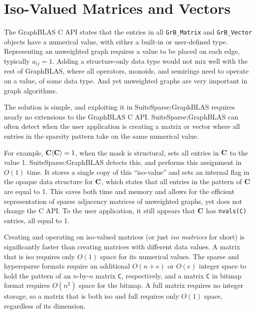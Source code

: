 
\newpage
\section{Iso-Valued Matrices and Vectors } %
\label{iso}

The GraphBLAS C API states that the entries in all \verb'GrB_Matrix' and
\verb'GrB_Vector' objects have a numerical value, with either a built-in or
user-defined type.  Representing an unweighted graph requires a value to be
placed on each edge, typically $a_{ij}=1$.  Adding a structure-only data type
would not mix well with the rest of GraphBLAS, where all operators, monoids,
and semirings need to operate on a value, of some data type.  And yet
unweighted graphs are very important in graph algorithms.

The solution is simple, and exploiting it in SuiteSparse:GraphBLAS requires
nearly no extensions to the GraphBLAS C API.   SuiteSparse:GraphBLAS can often
detect when the user application is creating a matrix or vector where all
entries in the sparsity pattern take on the same numerical value.

For example, ${\bf C \langle C \rangle} = 1$, when the mask is structural, sets
all entries in $\bf C$ to the value 1.  SuiteSparse:GraphBLAS detects this, and
performs this assignment in $O(1)$ time.  It stores a single copy of this
``iso-value'' and sets an internal flag in the opaque data structure for $\bf
C$, which states that all entries in the pattern of $\bf C$ are equal to 1.
This saves both time and memory and allows for the efficient representation of
sparse adjacency matrices of unweighted graphs, yet does not change the C API.
To the user application, it still appears that $\bf C$ has \verb'nvals(C)'
entries, all equal to 1.

Creating and operating on iso-valued matrices (or just {\em iso matrices} for
short) is significantly faster than creating matrices with different data
values.  A matrix that is iso requires only $O(1)$ space for its numerical
values.  The sparse and hypersparse formats require an additional $O(n+e)$ or
$O(e)$ integer space to hold the pattern of an $n$-by-$n$ matrix \verb'C',
respectively, and a matrix \verb'C' in bitmap format requires $O(n^2)$ space
for the bitmap.  A full matrix requires no integer storage, so a matrix that is
both iso and full requires only $O(1)$ space, regardless of its dimension.

